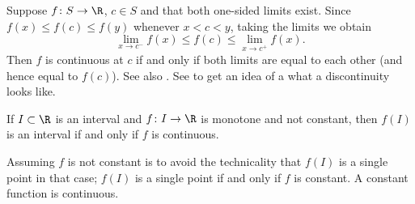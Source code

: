 \documentclass[12pt]{book}
\begin{document}
Suppose $f \colon S \to \R$, $c \in S$ and
that both one-sided limits exist.
Since $f(x) \leq f(c) \leq f(y)$
whenever $x < c < y$, taking the limits we obtain
\begin{equation*}
\lim_{x \to c^-} f(x) \leq f(c) \leq \lim_{x \to c^+} f(x) .
\end{equation*}
Then $f$ is continuous at $c$ if and only if both limits are equal
to each other (and hence equal to $f(c)$).
See also
.
See  to get an idea of a what a discontinuity
looks like.

%
%
%
%
%

\begin{cor} \label{cor:continterval}
If $I \subset \R$ is an interval and $f \colon I \to \R$ is 
monotone and not constant, then $f(I)$ is an interval if and only if $f$
is continuous.
\end{cor}

Assuming $f$ is not constant is to avoid the technicality
that $f(I)$ is a single point in that case; $f(I)$ is a single
point if and only if $f$ is constant.
A constant function is 
continuous.
\end{document}
